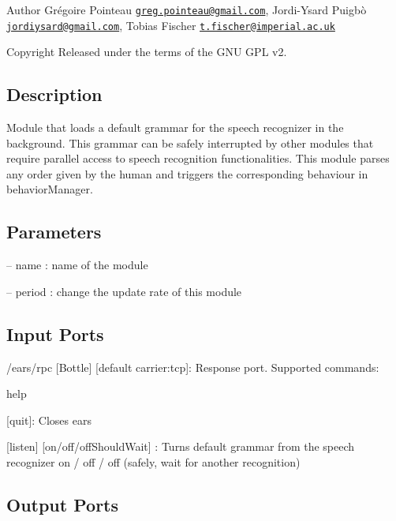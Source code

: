 \begin{DoxyAuthor}{Author}
Grégoire Pointeau \href{mailto:greg.pointeau@gmail.com}{\tt greg.\+pointeau@gmail.\+com}, Jordi-\/\+Ysard Puigbò \href{mailto:jordiysard@gmail.com}{\tt jordiysard@gmail.\+com}, Tobias Fischer \href{mailto:t.fischer@imperial.ac.uk}{\tt t.\+fischer@imperial.\+ac.\+uk} ~\newline
 
\end{DoxyAuthor}
\begin{DoxyCopyright}{Copyright}
Released under the terms of the G\+NU G\+PL v2. 
\end{DoxyCopyright}
\hypertarget{group__touchDetector_intro_sec}{}\subsection{Description}\label{group__touchDetector_intro_sec}
Module that loads a default grammar for the speech recognizer in the background. This grammar can be safely interrupted by other modules that require parallel access to speech recognition functionalities. This module parses any order given by the human and triggers the corresponding behaviour in behavior\+Manager.\hypertarget{group__touchDetector_parameters_sec}{}\subsection{Parameters}\label{group__touchDetector_parameters_sec}

\begin{DoxyItemize}
\item -- name \+: name of the module
\item -- period \+: change the update rate of this module 
\end{DoxyItemize}\hypertarget{group__touchDetector_inputports_sec}{}\subsection{Input Ports}\label{group__touchDetector_inputports_sec}

\begin{DoxyItemize}
\item /ears/rpc \mbox{[}Bottle\mbox{]} \mbox{[}default carrier\+:tcp\mbox{]}\+: Response port. Supported commands\+:
\begin{DoxyItemize}
\item help
\item \mbox{[}\textquotesingle{}quit\textquotesingle{}\mbox{]}\+: Closes ears
\item \mbox{[}\textquotesingle{}listen\textquotesingle{}\mbox{]} \mbox{[}\textquotesingle{}on\textquotesingle{}/\textquotesingle{}off\textquotesingle{}/off\+Should\+Wait\mbox{]} \+: Turns default grammar from the speech recognizer on / off / off (safely, wait for another recognition)
\end{DoxyItemize}
\end{DoxyItemize}\hypertarget{group__touchDetector_outputports_sec}{}\subsection{Output Ports}\label{group__touchDetector_outputports_sec}

